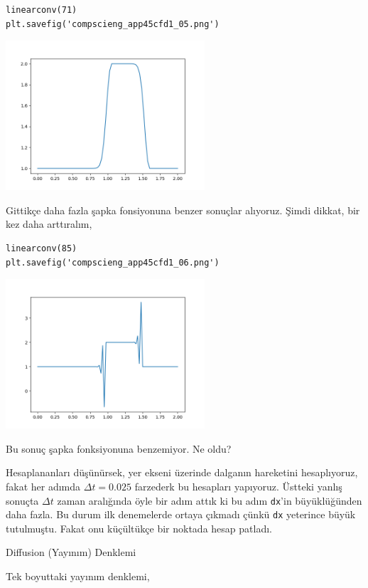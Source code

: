 \documentclass[12pt,fleqn]{article}\usepackage{../../common}
\begin{document}
\begin{verbatim}
linearconv(71)
plt.savefig('compscieng_app45cfd1_05.png')
\end{verbatim}

\includegraphics[width=20em]{compscieng_app45cfd1_05.png}

Gittikçe daha fazla şapka fonsiyonuna benzer sonuçlar alıyoruz. Şimdi dikkat,
bir kez daha arttıralım,

\begin{verbatim}
linearconv(85)
plt.savefig('compscieng_app45cfd1_06.png')
\end{verbatim}

\includegraphics[width=20em]{compscieng_app45cfd1_06.png}

Bu sonuç şapka fonksiyonuna benzemiyor. Ne oldu?

Hesaplananları düşünürsek, yer ekseni üzerinde dalganın hareketini hesaplıyoruz,
fakat her adımda $\Delta t = 0.025$ farzederk bu hesapları yapıyoruz. Üstteki
yanlış sonuçta $\Delta t$ zaman aralığında öyle bir adım attık ki bu adım
\verb!dx!'in büyüklüğünden daha fazla. Bu durum ilk denemelerde ortaya çıkmadı
çünkü \verb!dx! yeterince büyük tutulmuştu. Fakat onu küçültükçe bir noktada
hesap patladı.

Diffusion (Yayınım) Denklemi

Tek boyuttaki yayınım denklemi,
\end{document}
